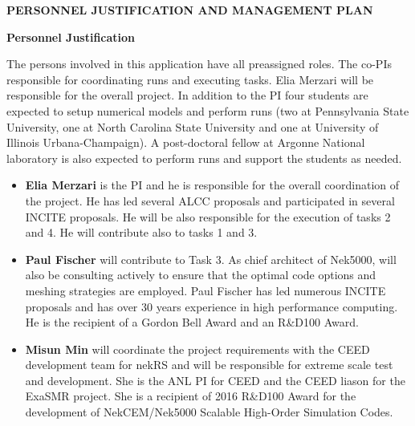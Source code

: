 \documentclass[11pt,letterpaper,english]{article}
\begin{document}
\setlength{\parindent}{0in} %

\pagestyle{fancy}   \renewcommand{%
\headrulewidth}{0.0pt}

\begin{center}
\bf {PERSONNEL JUSTIFICATION AND MANAGEMENT PLAN} \\
\end{center}

\vspace{-.25in}
\begin{flushleft}
{\noindent \bf  {Personnel Justification}}

The persons involved in this application have all preassigned roles. The co-PIs responsible for coordinating runs and executing tasks. Elia Merzari will be responsible for the overall  project. In addition to the PI four students are expected to setup numerical models and perform runs (two at Pennsylvania State University, one at North Carolina State University and one at University of Illinois Urbana-Champaign). A post-doctoral fellow at Argonne National laboratory is also expected to perform runs and support the students as needed.

\vspace{-.15in}
\begin{itemize}
\item \textbf{Elia Merzari} is the PI and he is responsible for the overall coordination of the project. He has led several ALCC proposals and participated in several INCITE proposals. He will be also responsible for the execution of tasks 2 and 4. He will contribute also to tasks 1 and 3.
\item \textbf{Paul Fischer} will contribute to Task 3. As chief architect of Nek5000, will also be  consulting actively to ensure that the optimal code options and meshing strategies are employed. Paul Fischer has led numerous INCITE proposals and has over 30 years experience in high performance computing. He is the recipient of a Gordon Bell Award and an R\&D100 Award.

\item \textbf{Misun Min} will coordinate the project requirements with the CEED development team for nekRS and will be responsible for extreme scale test and development.
She is the ANL PI for CEED and the CEED liason for the ExaSMR project. She is a recipient of 2016 R\&D100 Award for the development of NekCEM/Nek5000 Scalable High-Order Simulation Codes.


\end{itemize}
\end{flushleft}
\end{document}
